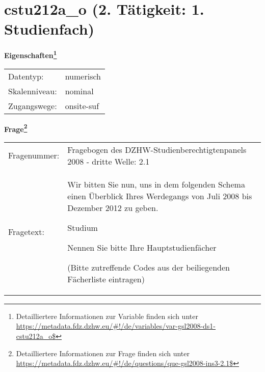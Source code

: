 
    \setcounter{footnote}{0}

    \vspace*{-1.8cm}
	\section{cstu212a\_o (2. Tätigkeit: 1. Studienfach)}
	\label{section:cstu212a_o}



    \vspace*{0.5cm}
    \noindent\textbf{Eigenschaften\footnote{Detailliertere Informationen zur Variable finden sich unter
		\url{https://metadata.fdz.dzhw.eu/\#!/de/variables/var-gsl2008-ds1-cstu212a_o$}}}\\
	\begin{tabularx}{\hsize}{@{}lX}
	Datentyp: & numerisch \\
	Skalenniveau: & nominal \\
	Zugangswege: &
	  onsite-suf
 \\
    \end{tabularx}



				\vspace*{0.5cm}
                \noindent\textbf{Frage\footnote{Detailliertere Informationen zur Frage finden sich unter
		              \url{https://metadata.fdz.dzhw.eu/\#!/de/questions/que-gsl2008-ins3-2.1$}}}\\
				\begin{tabularx}{\hsize}{@{}lX}
					Fragenummer: &
					  Fragebogen des DZHW-Studienberechtigtenpanels 2008 - dritte Welle:
					  2.1
 \\
					Fragetext: & Wir bitten Sie nun, uns in dem folgenden Schema einen Überblick Ihres Werdegangs von Juli 2008 bis Dezember 2012 zu geben.\par  Studium\par  Nennen Sie bitte Ihre Hauptstudienfächer\par  (Bitte zutreffende Codes aus der beiliegenden Fächerliste eintragen) \\
				\end{tabularx}





